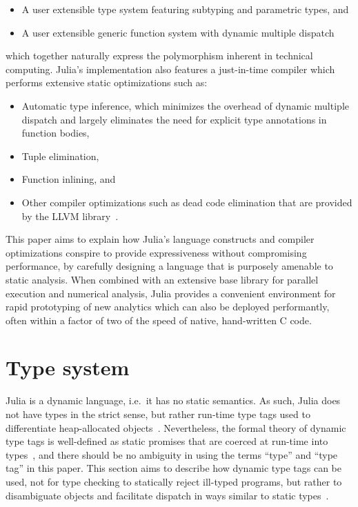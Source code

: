 \documentclass[pldi]{sigplanconf-pldi15}
\begin{document}
\begin{itemize}
	\item A user extensible type system featuring subtyping and parametric
		types, and
	\item A user extensible generic function system with dynamic multiple
		dispatch
\end{itemize}
%
which together naturally express the polymorphism inherent in technical
computing. Julia's implementation also features a just-in-time compiler which
performs extensive static optimizations such as:

\begin{itemize}
	\item Automatic type inference, which minimizes the overhead of dynamic
		multiple dispatch and largely eliminates the need for explicit
		type annotations in function bodies,

	\item Tuple elimination,
	\item Function inlining, and
	\item Other compiler optimizations such as dead code elimination that
		are provided by the LLVM library~\cite{Lattner2004}.
\end{itemize}

This paper aims to explain how Julia's language constructs and compiler
optimizations conspire to provide expressiveness without compromising
performance, by carefully designing a language that is purposely amenable to
static analysis. When combined with an extensive base library for parallel
execution and numerical analysis, Julia provides a convenient environment for
rapid prototyping of new analytics which can also be deployed performantly,
often within a factor of two of the speed of native, hand-written C code.



\section{Type system}

Julia is a dynamic language, i.e.\ it has no static semantics. As such, Julia
does not have types in the strict sense, but rather run-time type tags used to
differentiate heap-allocated objects~\cite[Section 11.10, p. 142]{Pierce2002}.
Nevertheless, the formal theory of dynamic type tags is well-defined as static
promises that are coerced at run-time into 
types~\cite{Henglein1994,Shields1998,Baars2002}, and there should be no ambiguity
in using the terms ``type'' and ``type tag'' in this paper. This
section aims to describe how dynamic type tags can be used, not for type
checking to statically reject ill-typed programs, but rather to disambiguate
objects and facilitate dispatch in ways similar to static
types~\cite{Tratt2009,Kell2014}.
\end{document}
